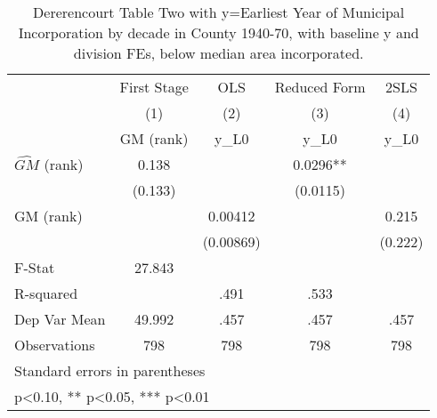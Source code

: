 \begin{table}[htbp]\centering
\def\sym#1{\ifmmode^{#1}\else\(^{#1}\)\fi}
\caption{Dererencourt Table Two with y=Earliest Year of Municipal Incorporation by decade in County 1940-70, with baseline y and division FEs, below median area incorporated.}
\begin{tabular}{l*{4}{c}}
\toprule
                    & First Stage   &         OLS   &Reduced Form   &        2SLS   \\
                    &\multicolumn{1}{c}{(1)}&\multicolumn{1}{c}{(2)}&\multicolumn{1}{c}{(3)}&\multicolumn{1}{c}{(4)}\\
                    &\multicolumn{1}{c}{GM  (rank)}&\multicolumn{1}{c}{y\_L0}&\multicolumn{1}{c}{y\_L0}&\multicolumn{1}{c}{y\_L0}\\
\midrule
$\hat{GM}$ (rank)   &       0.138   &               &      0.0296** &               \\
                    &     (0.133)   &               &    (0.0115)   &               \\
\addlinespace
GM  (rank)          &               &     0.00412   &               &       0.215   \\
                    &               &   (0.00869)   &               &     (0.222)   \\
\midrule
F-Stat              &      27.843   &               &               &               \\
R-squared           &               &        .491   &        .533   &               \\
Dep Var Mean        &      49.992   &        .457   &        .457   &        .457   \\
Observations        &         798   &         798   &         798   &         798   \\
\bottomrule
\multicolumn{5}{l}{\footnotesize Standard errors in parentheses}\\
\multicolumn{5}{l}{\footnotesize * p<0.10, ** p<0.05, *** p<0.01}\\
\end{tabular}
\end{table}
